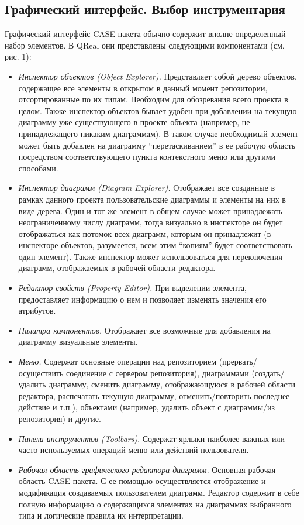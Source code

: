 \documentclass[a5paper]{article}
\begin{document}
\subsection{Графический интерфейс. Выбор инструментария}

Графический интерфейс CASE-пакета обычно
содержит вполне определенный набор элементов. В
QReal они представлены следующими
компонентами (см. рис. 1):

\begin{itemize}
  \item \textit{Инспектор объектов (Object Explorer).} Представляет
        собой дерево объектов, содержащее все элементы в открытом в данный
        момент репозитории, отсортированные по их типам. Необходим для
        обозревания всего проекта в целом. Также инспектор объектов бывает
        удобен при добавлении на текущую диаграмму уже существующего
        в проекте объекта (например, не принадлежащего никаким диаграммам). В
        таком случае необходимый элемент может быть добавлен на диаграмму
        ``перетаскиванием'' в ее рабочую область посредством соответствующего
        пункта контекстного меню или другими способами.
  \item \textit{Инспектор диаграмм (Diagram Explorer).} Отображает все
        созданные в рамках данного проекта пользовательские диаграммы и
        элементы на них в виде дерева. Один и тот же элемент в общем случае
        может принадлежать неограниченному числу диаграмм, тогда визуально в
        инспекторе он будет отображаться как потомок всех диаграмм, которым он
        принадлежит (в инспекторе объектов, разумеется, всем этим ``копиям''
        будет соответствовать один элемент). Также инспектор может
        использоваться для переключения диаграмм, отображаемых в рабочей
        области редактора.
  \item \textit{Редактор свойств (Property Editor).} При выделении
    элемента, предоставляет информацию о нем и позволяет изменять значения
        его атрибутов.
  \item \textit{Палитра компонентов.} Отображает все возможные для добавления на
        диаграмму визуальные элементы.
  \item \textit{Меню.} Содержат основные операции над репозиторием
        (прервать/осуществить соединение с сервером репозитория), диаграммами
        (создать/удалить диаграмму, сменить диаграмму, отображающуюся в рабочей
        области редактора, распечатать текущую диаграмму, отменить/повторить
        последнее действие и т.п.), объектами (например, удалить объект с
        диаграммы/из репозитория) и другие.
  \item \textit{Панели инструментов (Toolbars)}. Содержат
        ярлыки наиболее важных или часто используемых операций меню или
        действий пользователя.
  \item \textit{Рабочая область графического редактора диаграмм}. Основная
        рабочая область CASE-пакета. С ее помощью
        осуществляется отображение и модификация создаваемых пользователем
        диаграмм. Редактор содержит в себе полную информацию о содержащихся
        элементах на диаграммах выбранного типа и логические правила их
        интерпретации.
\end{itemize}
\end{document}
